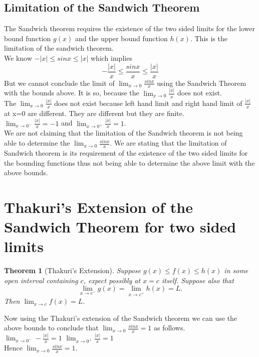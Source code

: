 \documentclass[a4paper,twoside,12pt]{article}
\theoremstyle{plain}
\newtheorem{theorem}{Theorem}[section]
\theoremstyle{definition}
\theoremstyle{theorem}
\begin{document}
{\subsection{Limitation of the Sandwich Theorem}
The Sandwich theorem requires the existence of the two sided limits for the lower bound function $g(x)$ and the upper bound function $h(x)$. This is the limitation of the sandwich theorem. \\
We know \(\displaystyle - \left | x \right | \leq sinx \leq \left | x \right | \) which implies \[-\frac{\left | x \right |}{x} \leq \frac{sinx}{x} \leq \frac{\left | x \right |}{x}\]
But we cannot conclude the limit of \(\displaystyle \lim_{x \to 0} \frac{sinx}{x}\) using the Sandwich Theorem with the bounds above. It is so, because the \(\displaystyle \lim_{x \to 0} \frac{|x|}{x}\) does not exist. \\[2mm]
The \(\displaystyle \lim_{x \to 0} \frac{|x|}{x}\) does not exist because left hand limit and right hand limit of \(\displaystyle \frac{|x|}{x}\) at x=0 are different. They are different but they are finite.\\
\(\displaystyle \lim_{x \to 0^-} \frac{|x|}{x}=-1\) \hspace{5mm} and \hspace{5cm} \(\displaystyle \lim_{x \to 0^+} \frac{|x|}{x}=1\). \\[3mm]
We are not claiming that the limitation of the Sandwich theorem is not being able to determine the \(\displaystyle \lim_{x \to 0} \frac{sinx}{x}\). We are stating that the limitation of Sandwich theorem is its requirement of  the existence of the two sided limits for the bounding functions thus not being able to determine the above limit with the above bounds.
\vspace{5mm}
\section{Thakuri's Extension of the Sandwich Theorem for two sided limits}
\begin{theorem}[Thakuri's Extension]
  \label{thakuri}
Suppose $g(x) \leq f(x) \leq h(x)$ in some open interval containing $c$, expect possibly at $x=c$ itself. Suppose also that $$\lim_{x \to c^-} g(x) = \lim_{x \to c^+} h(x) =L  .$$ Then $\displaystyle \lim_{x \to c} f(x)=L$.
\end{theorem}
Now using the Thakuri's extension of the Sandwich theorem we can use the above bounds to conclude that \(\displaystyle \lim_{x \to 0} \frac{sinx}{x}=1\) as follows. \\[2mm]
 \(\displaystyle \lim_{x \to 0^-} -\frac{|x|}{x}=1\) \hspace{7cm}
 \(\displaystyle \lim_{x \to 0^+} \frac{|x|}{x}=1\) \\[1mm]
 Hence \(\displaystyle \lim_{x \to 0} \frac{sinx}{x}=1\).

}
\end{document}
